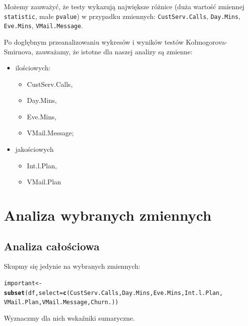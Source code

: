 \documentclass{article}\usepackage[]{graphicx}\usepackage[]{color}
\makeatletter
\newcommand{\hlstd}[1]{\textcolor[rgb]{0.345,0.345,0.345}{#1}}%
\newcommand{\hlkwb}[1]{\textcolor[rgb]{0.69,0.353,0.396}{#1}}%
\newcommand{\hlkwc}[1]{\textcolor[rgb]{0.333,0.667,0.333}{#1}}%
\newcommand{\hlkwd}[1]{\textcolor[rgb]{0.737,0.353,0.396}{\textbf{#1}}}%
\newenvironment{kframe}{%
 \def\at@end@of@kframe{}%
 \ifinner\ifhmode%
  \def\at@end@of@kframe{\end{minipage}}%
  \begin{minipage}{\columnwidth}%
 \fi\fi%
 \def\FrameCommand##1{\hskip\@totalleftmargin \hskip-\fboxsep
 \colorbox{shadecolor}{##1}\hskip-\fboxsep
     \hskip-\linewidth \hskip-\@totalleftmargin \hskip\columnwidth}%
 \MakeFramed {\advance\hsize-\width
   \@totalleftmargin\z@ \linewidth\hsize
   \@setminipage}}%
 {\par\unskip\endMakeFramed%
 \at@end@of@kframe}
\newenvironment{knitrout}{}{} %
\makeatother
\begin{document}
Możemy zauważyć, że testy wykazują największe różnice (duża wartość zmiennej \verb|statistic|, małe \verb|pvalue|) w przypadku zmiennych: \verb|CustServ.Calls|, \verb|Day.Mins|, \verb|Eve.Mins|, \verb|VMail.Message|.


Po dogłębnym przeanalizowaniu wykresów i wyników testów Kołmogorova-Smirnova, zauważamy, że istotne dla naszej analizy są zmienne:
\begin{itemize}
  \item ilościowych:
    \begin{itemize}
    \item CustServ.Calls,
    \item Day.Mins,
    \item Eve.Mins,
    \item VMail.Message;
    \end{itemize}
  \item jakościowych
    \begin{itemize}
    \item Int.l.Plan,
    \item VMail.Plan
    \end{itemize}
\end{itemize}

\section{Analiza wybranych zmiennych}
\subsection{Analiza całościowa}
Skupmy się jedynie na wybranych zmiennych:
\begin{knitrout}
\color{fgcolor}\begin{kframe}
\begin{alltt}
\hlstd{important} \hlkwb{<-} \hlkwd{subset}\hlstd{(df,} \hlkwc{select}\hlstd{=}\hlkwd{c}\hlstd{(CustServ.Calls, Day.Mins, Eve.Mins, Int.l.Plan,}
                                 \hlstd{VMail.Plan, VMail.Message, Churn.))}
\end{alltt}
\end{kframe}
\end{knitrout}

Wyznaczmy dla nich wskaźniki sumaryczne.
\end{document}
